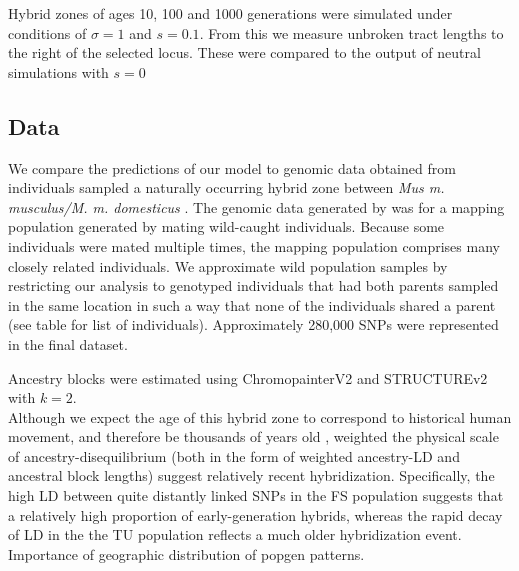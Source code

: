 \documentclass[12pt]{article}
\begin{document}
Hybrid zones of ages 10, 100 and 1000 generations were simulated under conditions of $\sigma=1$ and $s=0.1$. From this we measure unbroken tract lengths to the right of the selected locus. These were compared to the output of neutral simulations with $s=0$

\subsection{Data}
We compare the predictions of our model to genomic data obtained from individuals sampled a naturally occurring hybrid zone between \emph{Mus m. musculus/M. m. domesticus} \cite{Turner2011,Turner2014}. The genomic data generated by \citep{Turner2014} was for a mapping population generated by mating wild-caught individuals. Because some individuals were mated multiple times, the mapping population comprises many closely related individuals. We approximate wild population samples by restricting our analysis to genotyped individuals that had both parents sampled in the same location in such a way that none of the individuals shared a parent (see table for list of individuals). Approximately 280,000 SNPs were represented in the final dataset. 

Ancestry blocks were estimated using ChromopainterV2 \cite{Lawson2012} and STRUCTUREv2 \cite{Falush2003} with $k=2$.\\


Although we expect the age of this hybrid zone to correspond to historical human movement, and therefore be thousands of years old \cite{Teschke2008}, weighted the physical scale of ancestry-disequilibrium (both in the form of weighted ancestry-LD \citep{Loh2013} and ancestral block lengths) suggest relatively recent hybridization. Specifically, the high LD between quite distantly linked SNPs in the FS population suggests that a relatively high proportion of early-generation hybrids, whereas the rapid decay of LD in the the TU population reflects a much older hybridization event. Importance of geographic distribution of popgen patterns. 
\end{document}
